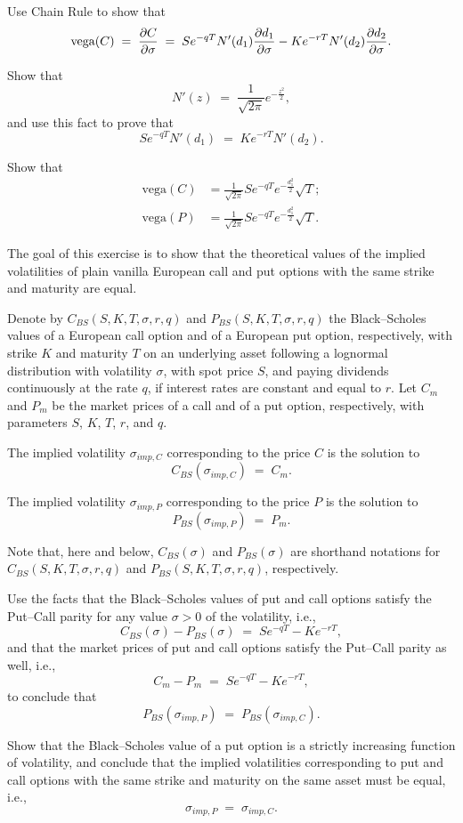 \begin{exercises}
\begin{subparts}
\item Use Chain Rule to show that
\[
\text{vega}(C) \;=\; \frac{\partial C}{\partial \sigma} \;=\; Se^{-qT}N'(d_1)\frac{\partial d_1}{\partial \sigma} -
Ke^{-rT}N'(d_2)\frac{\partial d_2}{\partial \sigma}.
\]
\item Show that
\[
N'(z) \;=\; \frac{1}{\sqrt{2\pi}}e^{-\frac{z^2}{2}},
\]
and use this fact to prove that
\[
Se^{-qT}N'(d_1) \;=\; Ke^{-rT}N'(d_2).
\]
\item Show that
\begin{align*}
\text{vega}(C) &= \frac{1}{\sqrt{2\pi}}Se^{-qT}e^{-\frac{d_1^2}{2}}\sqrt{T};\\
\text{vega}(P) &= \frac{1}{\sqrt{2\pi}}Se^{-qT}e^{-\frac{d_1^2}{2}}\sqrt{T}.
\end{align*}
\end{subparts}

\item The goal of this exercise is to show that the theoretical values of the implied
volatilities of plain vanilla European call and put options with the same strike and
maturity are equal.

Denote by $C_{BS}(S,K,T,\sigma,r,q)$ and $P_{BS}(S,K,T,\sigma,r,q)$ the Black--Scholes
values of a European call option and of a European put option, respectively, with
strike $K$ and maturity $T$ on an underlying asset following a lognormal distribution
with volatility $\sigma$, with spot price $S$, and paying dividends continuously at the
rate $q$, if interest rates are constant and equal to $r$. Let $C_m$ and $P_m$ be the
market prices of a call and of a put option, respectively, with parameters $S$, $K$,
$T$, $r$, and $q$.

The implied volatility $\sigma_{imp,C}$ corresponding to the price $C$ is the solution
to
\[
C_{BS}(\sigma_{imp,C}) \;=\; C_m.
\]

The implied volatility $\sigma_{imp,P}$ corresponding to the price $P$ is the solution
to
\[
P_{BS}(\sigma_{imp,P}) \;=\; P_m.
\]

Note that, here and below, $C_{BS}(\sigma)$ and $P_{BS}(\sigma)$ are shorthand notations
for $C_{BS}(S,K,T,\sigma,r,q)$ and $P_{BS}(S,K,T,\sigma,r,q)$, respectively.

\begin{subparts}
\item Use the facts that the Black--Scholes values of put and call options satisfy the
Put--Call parity for any value $\sigma > 0$ of the volatility, i.e.,
\[
C_{BS}(\sigma) - P_{BS}(\sigma) \;=\; Se^{-qT} - Ke^{-rT},
\]
and that the market prices of put and call options satisfy the Put--Call parity as
well, i.e.,
\[
C_m - P_m \;=\; Se^{-qT} - Ke^{-rT},
\]
to conclude that
\[
P_{BS}(\sigma_{imp,P}) \;=\; P_{BS}(\sigma_{imp,C}).
\]
\item Show that the Black--Scholes value of a put option is a strictly increasing
function of volatility, and conclude that the implied volatilities corresponding to put
and call options with the same strike and maturity on the same asset must be equal,
i.e.,
\[
\sigma_{imp,P} \;=\; \sigma_{imp,C}.
\]
\end{subparts}


\end{exercises}
